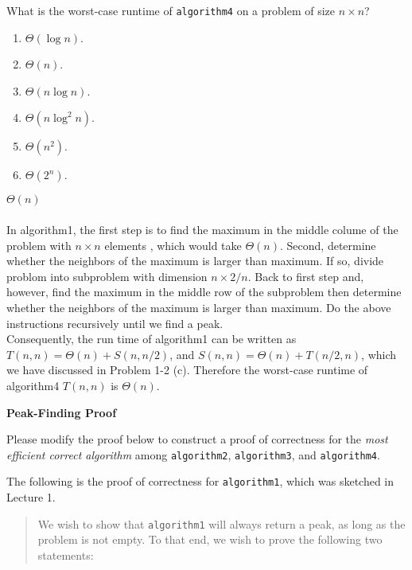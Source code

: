 \documentclass[12pt,twoside]{article}
\begin{document}
\begin{problems}
\begin{problemparts}
\fi

\problempart {} What is the worst-case runtime of \texttt{algorithm4} on a problem of size $n \times n$?
\begin{enumerate}
\item $\Theta(\log n)$.
\item $\Theta(n)$.
\item $\Theta(n \log n)$.
\item $\Theta(n \log^2 n)$.
\item $\Theta(n^2)$.
\item $\Theta(2^n)$.
\end{enumerate}

\ifsolution \solution{}
$\Theta(n)$
\\
\\
In algorithm1, the first step is to find the maximum in the middle colume of the problem with $n\times n$ elements , 
which would take $\Theta(n)$. Second, determine whether the neighbors of the maximum is larger than maximum. If so, 
divide problom into subproblem with dimension $n\times2/n$. Back to first step and, however, find the maximum in the 
middle row of the subproblem then determine whether the neighbors of the maximum is larger than maximum. Do the above 
instructions recursively until we find a peak.
\\
Consequently, the run time of algorithm1 can be written as $T(n, n) = \Theta(n) + S(n,n/2)$, and $S(n, n) = \Theta(n) + T(n/2,n)$,
 which we have discussed in Problem 1-2 (c). Therefore the worst-case runtime of algorithm4 $T(n,n)$ is $\Theta(n)$.
\\
\fi

\end{problemparts}

\problem {} \textbf{Peak-Finding Proof}

Please modify the proof below to construct a proof of correctness
for the \emph{most efficient correct algorithm}
among \texttt{algorithm2}, \texttt{algorithm3}, and \texttt{algorithm4}.

The following is the proof of correctness
for \texttt{algorithm1},
which was sketched in Lecture 1.

\begin{quote}
We wish to show that \texttt{algorithm1}
will always return a peak,
as long as the problem is not empty.
To that end,
we wish to prove the following two statements:


\end{quote}
\end{problems}
\end{document}
